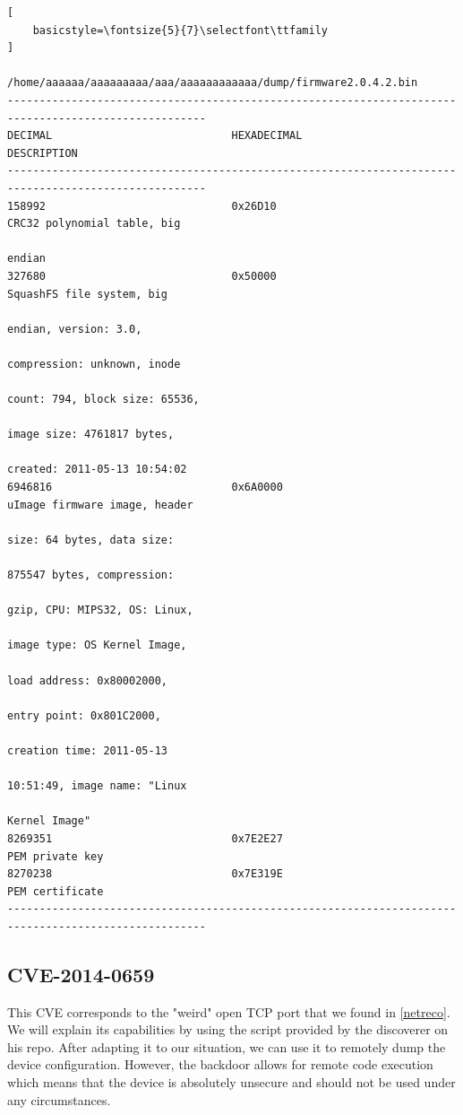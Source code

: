 \documentclass{article}
\begin{document}
\begin{lstlisting}[
    basicstyle=\fontsize{5}{7}\selectfont\ttfamily
]
                  /home/aaaaaa/aaaaaaaaa/aaa/aaaaaaaaaaaa/dump/firmware2.0.4.2.bin
-----------------------------------------------------------------------------------------------------
DECIMAL                            HEXADECIMAL                        DESCRIPTION
-----------------------------------------------------------------------------------------------------
158992                             0x26D10                            CRC32 polynomial table, big 
                                                                      endian
327680                             0x50000                            SquashFS file system, big 
                                                                      endian, version: 3.0, 
                                                                      compression: unknown, inode 
                                                                      count: 794, block size: 65536, 
                                                                      image size: 4761817 bytes, 
                                                                      created: 2011-05-13 10:54:02
6946816                            0x6A0000                           uImage firmware image, header 
                                                                      size: 64 bytes, data size: 
                                                                      875547 bytes, compression: 
                                                                      gzip, CPU: MIPS32, OS: Linux, 
                                                                      image type: OS Kernel Image, 
                                                                      load address: 0x80002000, 
                                                                      entry point: 0x801C2000, 
                                                                      creation time: 2011-05-13 
                                                                      10:51:49, image name: "Linux 
                                                                      Kernel Image"
8269351                            0x7E2E27                           PEM private key
8270238                            0x7E319E                           PEM certificate
-----------------------------------------------------------------------------------------------------
\end{lstlisting}

\subsection{CVE-2014-0659}
This CVE corresponds to the "weird" open TCP port that we found in \ref{netreco}. We will explain its capabilities by using the script provided by the discoverer on his repo. After adapting it to our situation, we can use it to remotely dump the device configuration. However, the backdoor allows for remote code execution which means that the device is absolutely unsecure and should not be used under any circumstances.
\end{document}
